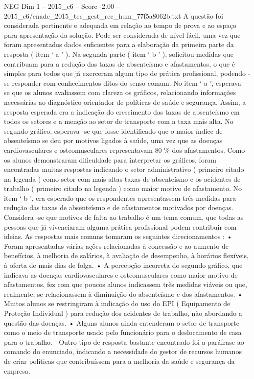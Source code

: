 \begin{textsample}{NEG Dim 1 – 2015\_c6 – Score -2.00 – 2015\_c6/enade\_2015\_tec\_gest\_rec\_hum\_77f5a8062b.txt}
A questão foi considerada pertinente e adequada em relação ao tempo de prova e ao espaço para apresentação da solução.
Pode ser considerada de nível fácil, uma vez que foram apresentados dados suficientes para a elaboração da primeira parte da resposta ( item ‘ a ’ ).
Na segunda parte ( item ‘ b ’ ), solicitou medidas que contribuam para a redução das taxas de absenteísmo e afastamentos, o que é simples para todos que já exerceram algum tipo de prática profissional, podendo -se responder com conhecimentos ditos do senso comum.
No item ‘ a ’, esperava -se que os alunos avaliassem com clareza os gráficos, relacionando informações necessárias ao diagnóstico orientador de políticas de saúde e segurança.
Assim, a resposta esperada era a indicação do crescimento das taxas de absenteísmo em todos os setores e a menção ao setor de transporte com a taxa mais alta.
No segundo gráfico, esperava -se que fosse identificado que o maior índice de absenteísmo se deu por motivos ligados à saúde, uma vez que as doenças cardiovasculares e osteomusculares representavam 80 \% dos afastamentos.
Como os alunos demonstraram dificuldade para interpretar os gráficos, foram encontradas muitas respostas indicando o setor administrativo ( primeiro citado na legenda ) como setor com mais altas taxas de absenteísmo e os acidentes de trabalho ( primeiro citado na legenda ) como maior motivo de afastamento.
No item ‘ b ’, era esperado que os respondentes apresentassem três medidas para redução das taxas de absenteísmo e de afastamentos motivados por doenças.
Considera -se que motivos de falta ao trabalho é um tema comum, que todas as pessoas que já vivenciaram alguma prática profissional podem contribuir com ideias.
As respostas mais comuns tomaram os seguintes direcionamentos : • Foram apresentadas várias ações relacionadas à concessão e ao aumento de benefícios, à melhoria de salários, à avaliação de desempenho, à horários flexíveis, à oferta de mais dias de folga. • A percepção incorreta do segundo gráfico, que indicava as doenças cardiovasculares e osteomusculares como maior motivo de afastamentos, fez com que poucos alunos indicassem três medidas viáveis ou que, realmente, se relacionassem à diminuição do absenteísmo e dos afastamentos. • Muitos alunos se restringiram à indicação do uso do EPI ( Equipamento de Proteção Individual ) para redução dos acidentes de trabalho, não abordando a questão das doenças. • Alguns alunos ainda entenderam o setor de transporte como o meio de transporte usado pelo funcionário para o deslocamento de casa para o trabalho.  Outro tipo de resposta bastante encontrado foi a paráfrase ao comando do enunciado, indicando a necessidade do gestor de recursos humanos de criar políticas que contribuíssem para a melhoria da saúde e segurança da empresa.

\end{textsample}
